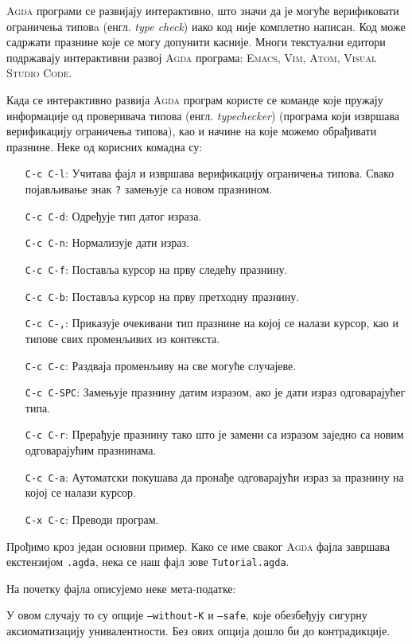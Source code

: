 \textsc{Agda} програми се развијају интерактивно, што значи да је могуће верификовати ограничења типовa (енгл. \emph{type check}) иако код није комплетно написан. Код може садржати празнине које се могу допунити касније. Многи текстуални едитори подржавају интерактивни развој \textsc{Agda} програма: \textsc{Emacs}, \textsc{Vim}, \textsc{Atom}, \textsc{Visual Studio Code}.

Када се интерактивно развија \textsc{Agda} програм користе се команде које пружају информације од проверивача типова (енгл. \emph{typechecker}) (програма који извршава верификацију ограничења типова), као и начине на које можемо обрађивати празнине. Неке од корисних комадна су:

\begin{itemize}
    \item[\texttt{C-c C-l}:]{Учитава фајл и извршава верификацију ограничења типова. Свако појављивање знак \texttt{?} замењује са новом празнином.}
    \item[\texttt{C-c C-d}:]{Одређује тип датог израза.}
    \item[\texttt{C-c C-n}:]{Нормализује дати израз.}
    \item[\texttt{C-c C-f}:]{Поставља курсор на прву следећу празнину.}
    \item[\texttt{C-c C-b}:]{Поставља курсор на прву претходну празнину.}
    \item[\texttt{C-c C-,}:]{Приказује очекивани тип празнине на којој се налази курсор, као и типове свих променљивих из контекста.}
    \item[\texttt{C-c C-c}:]{Раздваја променљиву на све могуће случајеве.}
    \item[\texttt{C-c C-SPC}:]{Замењује празнину датим изразом, ако је дати израз одговарајућег типа.}
    \item[\texttt{C-c C-r}:]{Прерађује празнину тако што је замени са изразом заједно са новим одговарајућим празнинама.}
    \item[\texttt{C-c C-a}:]{Аутоматски покушава да пронађе одговарајући израз за празнину на којој се налази курсор.}
    \item[\texttt{C-x C-c}:]{Преводи програм.}
\end{itemize}

Прођимо кроз један основни пример. Како се име сваког \textsc{Agda} фајла завршава екстензијом \texttt{.agda}, нека се наш фајл зове \texttt{Tutorial.agda}.

На почетку фајла описујемо неке мета-податке:
\begin{code}%
\>[0]\AgdaSymbol{\{-\#}\AgdaSpace{}%
\AgdaSpace{}%
\AgdaSpace{}%
\AgdaSpace{}%
\AgdaSymbol{\#-\}}\<%
\end{code}
У овом случају то су опције \texttt{--without-K} и \texttt{--safe}, које обезбеђују сигурну аксиоматизацију унивалентности. Без ових опција дошло би до контрадикције.

